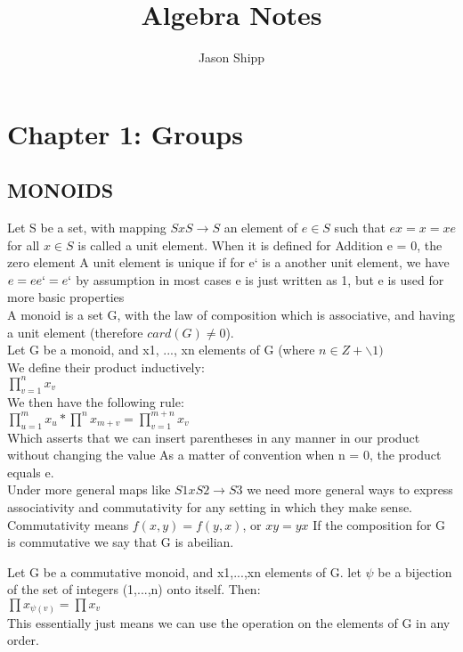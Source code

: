 \documentclass{article}
\begin{document}
\title{Algebra Notes}
\author{Jason Shipp}
\maketitle

\section*{Chapter 1: Groups}

\subsection*{MONOIDS}
    Let S be a set, with mapping \(S x S \to S\)
    an element of \(e \in S\) such that \(ex = x = xe\) for all
    \(x \in S\) is called a unit element. When it is defined
    for Addition e = 0, the zero element
    A unit element is unique if for e` is a another unit
    element, we have \(e = ee` = e`\) by assumption
    in most cases e is just written as 1, but e is used
    for more basic properties
    \\
    A monoid is a set G, with the law of composition
    which is associative, and having a unit element
    (therefore \(card(G) \ne 0\)).
    \\  
    Let G be a monoid, and x1, ..., xn elements of G
    (where \(n \in Z+\backslash{1})\) \\
    We define their product inductively: \\
        \(\prod\limits_{v=1}^{n} x_{v}\)\\
    We then have the following rule: \\
        \(\prod\limits_{u=1}^{m}x_{u} * \prod^{n}x_{m+v} =
        \prod\limits_{v=1}^{m+n}x_{v}\)\\
    Which asserts that we can insert parentheses in any
    manner in our product without changing the value
    As a matter of convention when n = 0, the product
    equals e.
    \\
    Under more general maps like \(S1 x S2 \to S3\) we need
    more general ways to express associativity and 
    commutativity for any setting in which they make 
    sense. 
    \\
    Commutativity means \(f(x,y) = f(y,x)\), or \(xy = yx\)
    If the composition for G is commutative we say that
    G is abeilian.

    Let G be a commutative monoid, and x1,...,xn elements
    of G. let \(\psi\) be a bijection of the set of integers
    (1,...,n) onto itself. Then:\\
        \(\prod x_{\psi(v)} = \prod x_{v}\)\\
    This essentially just means we can use the operation
    on the elements of G in any order.
\end{document}
